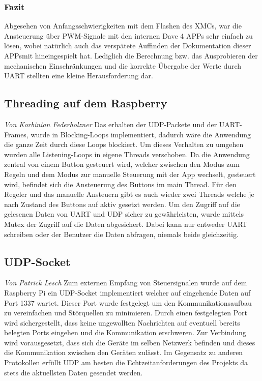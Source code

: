 \documentclass[12pt,a4paper,bibliography=totoc,listof=totoc]{scrartcl}
\begin{document}
\subsubsection{Fazit}
Abgesehen von Anfangsschwierigkeiten mit dem Flashen des XMCs, war die Ansteuerung über PWM-Signale 
mit den internen Dave 4 APPs sehr einfach zu lösen, wobei natürlich auch das verspätete Auffinden der Dokumentation dieser APPsmit hineingespielt hat. 
Lediglich die Berechnung bzw. das Ausprobieren der mechanischen Einschränkungen und die korrekte Übergabe der Werte durch UART stellten eine kleine Herausforderung dar. 

\subsection{Threading auf dem Raspberry}
\textit{Von Korbinian Federholzner}\newline
Das erhalten der UDP-Packete und der UART-Frames, wurde in Blocking-Loops implementiert, dadurch wäre die Anwendung 
die ganze Zeit durch diese Loops blockiert. Um dieses Verhalten zu umgehen wurden alle Listening-Loops in eigene Threads
verschoben. Da die Anwendung zentral von einem Button gesteuert wird, welcher zwischen den Modus zum Regeln und dem 
Modus zur manuelle Steuerung mit der App wechselt, gesteuert wird, befindet sich die Ansteuerung des Buttons im main Thread.
Für den Regeler und das manuelle Ansteuern gibt es auch wieder zwei Threads welche je nach Zustand des Buttons auf 
aktiv gesetzt werden. Um den Zugriff auf die gelesenen Daten von UART und UDP sicher zu gewährleisten, wurde mittels 
Mutex der Zugriff auf die Daten abgesichert. Dabei kann nur entweder UART schreiben oder der Benutzer die Daten abfragen,
niemals beide gleichzeitig.


\subsection{UDP-Socket}
\textit{Von Patrick Lesch}\newline
Zum externen Empfang von Steuersignalen wurde auf dem Raspberry Pi ein UDP-Socket implementiert welcher auf eingehende Daten auf
Port 1337 wartet. Dieser Port wurde festgelegt um den Kommunikationsaufbau zu vereinfachen und Störquellen zu minimieren. Durch 
einen festgelegten Port wird sichergestellt, dass keine ungewollten Nachrichten auf eventuell bereits belegten Ports eingehen und die 
Kommunikation erschweren. Zur Verbindung wird vorausgesetzt, dass sich die Geräte im selben Netzwerk befinden und dieses die Kommunikation
zwischen den Geräten zulässt. Im Gegensatz zu anderen Protokollen erfüllt UDP am besten die Echtzeitanforderungen des Projekts da stets
die aktuellsten Daten gesendet werden. 
\end{document}

